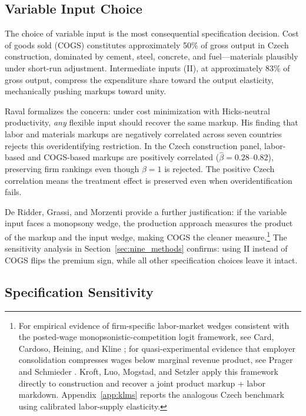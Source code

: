 \documentclass[11pt]{article}
\begin{document}
\subsection{Variable Input Choice}\label{sec:variable_input}

The choice of variable input is the most consequential specification decision. Cost of goods sold (COGS) constitutes approximately 50\% of gross output in Czech construction, dominated by cement, steel, concrete, and fuel---materials plausibly under short-run adjustment. Intermediate inputs (II), at approximately 83\% of gross output, compress the expenditure share toward the output elasticity, mechanically pushing markups toward unity.

Raval \cite{Raval2023} formalizes the concern: under cost minimization with Hicks-neutral productivity, \emph{any} flexible input should recover the same markup. His finding that labor and materials markups are negatively correlated across seven countries rejects this overidentifying restriction. In the Czech construction panel, labor-based and COGS-based markups are positively correlated ($\hat{\beta} = 0.28$--$0.82$), preserving firm rankings even though $\beta = 1$ is rejected. The positive Czech correlation means the treatment effect is preserved even when overidentification fails.

De Ridder, Grassi, and Morzenti \cite{DGM2026} provide a further justification: if the variable input faces a monopsony wedge, the production approach measures the product of the markup and the input wedge, making COGS the cleaner measure.\footnote{For empirical evidence of firm-specific labor-market wedges consistent with the posted-wage monopsonistic-competition logit framework, see Card, Cardoso, Heining, and Kline \cite{CCHK2018}; for quasi-experimental evidence that employer consolidation compresses wages below marginal revenue product, see Prager and Schmieder \cite{PragerSchmieder2021}. Kroft, Luo, Mogstad, and Setzler \cite{KLMS2025} apply this framework directly to construction and recover a joint product markup + labor markdown. Appendix~\ref{app:klms} reports the analogous Czech benchmark using calibrated labor-supply elasticity.} The sensitivity analysis in Section~\ref{sec:nine_methods} confirms: using II instead of COGS flips the premium sign, while all other specification choices leave it intact.

\subsection{Specification Sensitivity}\label{sec:sensitivity}
\end{document}

